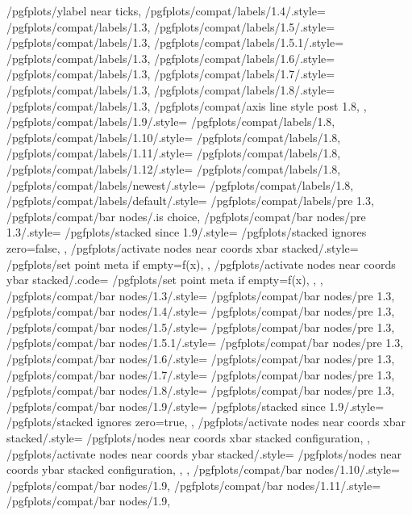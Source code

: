 {{		/pgfplots/ylabel near ticks},%
	/pgfplots/compat/labels/1.4/.style=		{/pgfplots/compat/labels/1.3},%
	/pgfplots/compat/labels/1.5/.style=		{/pgfplots/compat/labels/1.3},%
	/pgfplots/compat/labels/1.5.1/.style=	{/pgfplots/compat/labels/1.3},%
	/pgfplots/compat/labels/1.6/.style=		{/pgfplots/compat/labels/1.3},%
	/pgfplots/compat/labels/1.7/.style=		{/pgfplots/compat/labels/1.3},%
	/pgfplots/compat/labels/1.8/.style=		{
		/pgfplots/compat/labels/1.3,
		/pgfplots/compat/axis line style post 1.8,
	},%
	/pgfplots/compat/labels/1.9/.style=		{/pgfplots/compat/labels/1.8},%
	/pgfplots/compat/labels/1.10/.style=		{/pgfplots/compat/labels/1.8},%
	/pgfplots/compat/labels/1.11/.style=		{/pgfplots/compat/labels/1.8},%
	/pgfplots/compat/labels/1.12/.style=		{/pgfplots/compat/labels/1.8},%
	/pgfplots/compat/labels/newest/.style=	{/pgfplots/compat/labels/1.8},%
	/pgfplots/compat/labels/default/.style=	{/pgfplots/compat/labels/pre 1.3},%
	/pgfplots/compat/bar nodes/.is choice,
	/pgfplots/compat/bar nodes/pre 1.3/.style={%
		/pgfplots/stacked since 1.9/.style={
			/pgfplots/stacked ignores zero=false,%
		},%
		/pgfplots/activate nodes near coords xbar stacked/.style={%
			/pgfplots/set point meta if empty=f(x),%
		},%
		/pgfplots/activate nodes near coords ybar stacked/.code={%
			/pgfplots/set point meta if empty=f(x),%
		},%
	},%
	/pgfplots/compat/bar nodes/1.3/.style=		{/pgfplots/compat/bar nodes/pre 1.3},%
	/pgfplots/compat/bar nodes/1.4/.style=		{/pgfplots/compat/bar nodes/pre 1.3},%
	/pgfplots/compat/bar nodes/1.5/.style=		{/pgfplots/compat/bar nodes/pre 1.3},%
	/pgfplots/compat/bar nodes/1.5.1/.style=	{/pgfplots/compat/bar nodes/pre 1.3},%
	/pgfplots/compat/bar nodes/1.6/.style=		{/pgfplots/compat/bar nodes/pre 1.3},%
	/pgfplots/compat/bar nodes/1.7/.style=		{/pgfplots/compat/bar nodes/pre 1.3},%
	/pgfplots/compat/bar nodes/1.8/.style=		{/pgfplots/compat/bar nodes/pre 1.3},%
	/pgfplots/compat/bar nodes/1.9/.style=		{
		/pgfplots/stacked since 1.9/.style={
			/pgfplots/stacked ignores zero=true,%
		},
		/pgfplots/activate nodes near coords xbar stacked/.style={
			/pgfplots/nodes near coords xbar stacked configuration,
		},
		/pgfplots/activate nodes near coords ybar stacked/.style={
			/pgfplots/nodes near coords ybar stacked configuration,
		},
	},%
	/pgfplots/compat/bar nodes/1.10/.style=		{/pgfplots/compat/bar nodes/1.9},%
	/pgfplots/compat/bar nodes/1.11/.style=		{/pgfplots/compat/bar nodes/1.9},%
}
